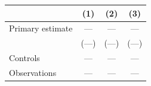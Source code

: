 \begin{tabular}{@{}lccc@{}}
  \toprule
  & (1) & (2) & (3) \\
  \midrule
  Primary estimate & --- & --- & --- \\
                   & (---) & (---) & (---) \\
  \addlinespace
  Controls         & --- & --- & --- \\
  Observations     & --- & --- & --- \\
  \bottomrule
\end{tabular}
